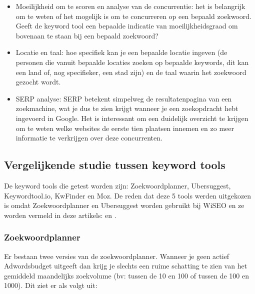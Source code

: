 \begin{itemize}
\item Moeilijkheid om te scoren en analyse van de concurrentie: het is belangrijk om te weten of het mogelijk is om te concurreren op een bepaald zoekwoord. Geeft de keyword tool een bepaalde indicatie van moeilijkheidsgraad om bovenaan te staan bij een bepaald zoekwoord? 
\item Locatie en taal: hoe specifiek kan je een bepaalde locatie ingeven (de personen die vanuit bepaalde locaties zoeken op bepaalde keywords, dit kan een land of, nog specifieker, een stad zijn) en de taal waarin het zoekwoord gezocht wordt. 
\item SERP analyse: SERP betekent simpelweg de resultatenpagina van een zoekmachine, wat je dus te zien krijgt wanneer je een zoekopdracht hebt ingevoerd in Google. Het is interessant om een duidelijk overzicht te krijgen om te weten welke websites de eerste tien plaatsen innemen en zo meer informatie te verkrijgen over deze concurrenten. 
\end{itemize}

\subsection{Vergelijkende studie tussen keyword tools}
\label{ch: Vergelijkende studie tussen keyword tools}

De keyword tools die getest worden zijn: Zoekwoordplanner, Ubersuggest, Keywordtool.io, KwFinder en Moz. De reden dat deze 5 tools werden uitgekozen is omdat Zoekwoordplanner en Ubersuggest worden gebruikt bij WiSEO en ze worden vermeld in deze artikels: \textcite{SEO13} en \textcite{SEOCOMPLETE}. 

\subsubsection{Zoekwoordplanner}
\label{ch: Zoekwoordplanner}
Er bestaan twee versies van de zoekwoordplanner. Wanneer je geen actief Adwordsbudget uitgeeft dan krijg je slechts een ruime schatting te zien van het gemiddeld maandelijks zoekvolume (bv: tussen de 10 en 100 of tussen de 100 en 1000). Dit ziet er als volgt uit:  

